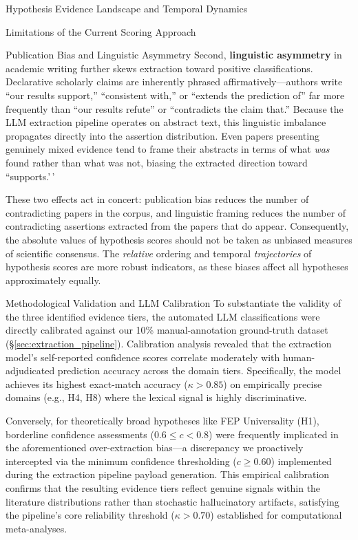 \documentclass[
  ignorenonframetext,
]{beamer}
\begin{document}
\begin{frame}{Hypothesis Evidence Landscape and Temporal Dynamics
\label{sec:hypothesis_results}}
\begin{block}{Limitations of the Current Scoring Approach}
\begin{block}{Publication Bias and Linguistic Asymmetry
\label{sec:pub_bias}}
Second, \textbf{linguistic asymmetry} in academic writing further skews
extraction toward positive classifications. Declarative scholarly claims
are inherently phrased affirmatively---authors write ``our results
support,'' ``consistent with,'' or ``extends the prediction of'' far
more frequently than ``our results refute'' or ``contradicts the claim
that.'' Because the LLM extraction pipeline operates on abstract text,
this linguistic imbalance propagates directly into the assertion
distribution. Even papers presenting genuinely mixed evidence tend to
frame their abstracts in terms of what \textit{was} found rather than
what was not, biasing the extracted direction toward ``supports.'\,'

These two effects act in concert: publication bias reduces the number of
contradicting papers in the corpus, and linguistic framing reduces the
number of contradicting assertions extracted from the papers that do
appear. Consequently, the absolute values of hypothesis scores should
not be taken as unbiased measures of scientific consensus. The
\textit{relative} ordering and temporal \textit{trajectories} of
hypothesis scores are more robust indicators, as these biases affect all
hypotheses approximately equally.
\end{block}
\end{block}

\begin{block}{Methodological Validation and LLM Calibration}
\protect{}\label{methodological-validation-and-llm-calibration}
To substantiate the validity of the three identified evidence tiers, the
automated LLM classifications were directly calibrated against our 10\%
manual-annotation ground-truth dataset
(\S\ref{sec:extraction_pipeline}). Calibration analysis revealed that
the extraction model's self-reported confidence scores correlate
moderately with human-adjudicated prediction accuracy across the domain
tiers. Specifically, the model achieves its highest exact-match accuracy
(\(\kappa > 0.85\)) on empirically precise domains (e.g., H4, H8) where
the lexical signal is highly discriminative.

Conversely, for theoretically broad hypotheses like FEP Universality
(H1), borderline confidence assessments (\(0.6 \le c < 0.8\)) were
frequently implicated in the aforementioned over-extraction bias---a
discrepancy we proactively intercepted via the minimum confidence
thresholding (\(c \ge 0.60\)) implemented during the extraction pipeline
payload generation. This empirical calibration confirms that the
resulting evidence tiers reflect genuine signals within the literature
distributions rather than stochastic hallucinatory artifacts, satisfying
the pipeline's core reliability threshold (\(\kappa > 0.70\))
established for computational meta-analyses.
\end{block}
\end{frame}
\end{document}
